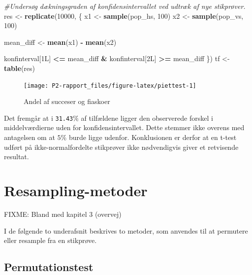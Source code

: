 \documentclass[
]{book}
\newenvironment{Shaded}{\begin{snugshade}}{\end{snugshade}}
\newcommand{\CommentTok}[1]{\textcolor[rgb]{0.56,0.35,0.01}{\textit{#1}}}
\newcommand{\DecValTok}[1]{\textcolor[rgb]{0.00,0.00,0.81}{#1}}
\newcommand{\KeywordTok}[1]{\textcolor[rgb]{0.13,0.29,0.53}{\textbf{#1}}}
\newcommand{\NormalTok}[1]{#1}
\newcommand{\OperatorTok}[1]{\textcolor[rgb]{0.81,0.36,0.00}{\textbf{#1}}}
\newcommand{\StringTok}[1]{\textcolor[rgb]{0.31,0.60,0.02}{#1}}
\theoremstyle{definition}
\theoremstyle{definition}
\theoremstyle{definition}
\theoremstyle{remark}
\begin{document}
\begin{Shaded}
\begin{Highlighting}[]
\CommentTok{#Undersøg dækningsgraden af konfidensintervallet ved udtræk af nye stikprøver.}
\NormalTok{res <-}\StringTok{ }\KeywordTok{replicate}\NormalTok{(}\DecValTok{10000}\NormalTok{, \{}
\NormalTok{  x1 <-}\StringTok{ }\KeywordTok{sample}\NormalTok{(pop_hs, }\DecValTok{100}\NormalTok{)}
\NormalTok{  x2 <-}\StringTok{ }\KeywordTok{sample}\NormalTok{(pop_vs, }\DecValTok{100}\NormalTok{)}

\NormalTok{  mean_diff <-}\StringTok{ }\KeywordTok{mean}\NormalTok{(x1) }\OperatorTok{-}\StringTok{ }\KeywordTok{mean}\NormalTok{(x2)}

\NormalTok{  konfinterval[1L] }\OperatorTok{<=}\StringTok{ }\NormalTok{mean_diff }\OperatorTok{&}\StringTok{ }\NormalTok{konfinterval[2L] }\OperatorTok{>=}\StringTok{ }\NormalTok{mean_diff}
\NormalTok{\})}
\NormalTok{tf <-}\StringTok{ }\KeywordTok{table}\NormalTok{(res)}
\end{Highlighting}
\end{Shaded}

\begin{figure}

{\centering \texttt{[image: P2-rapport\_files/figure-latex/piettest-1]}

}

\caption{Andel af succeser og fiaskoer}\label{fig:piettest}
\end{figure}

Det fremgår at i \texttt{31.43}\(\%\) af tilfældene ligger den observerede forskel i middelværdierne uden for konfidensintervallet. Dette stemmer ikke overens med antagelsen om at \(5\%\) burde ligge udenfor. Konklusionen er derfor at en t-test udført på ikke-normalfordelte stikprøver ikke nødvendigvis giver et retvisende resultat.

\hypertarget{resampling-metoder}{%
\chapter{Resampling-metoder}\label{resampling-metoder}}

FIXME: Bland med kapitel 3 (overvej)

I de følgende to underafsnit beskrives to metoder, som anvendes til at permutere eller resample fra en stikprøve.

\hypertarget{permutationstest}{%
\section{Permutationstest}\label{permutationstest}}
\end{document}
